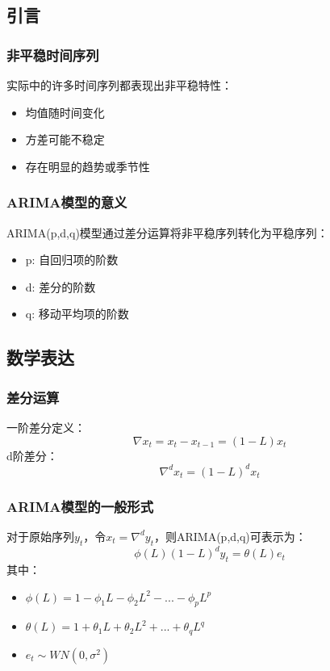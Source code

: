 \subsection{引言}
\subsubsection{非平稳时间序列}
实际中的许多时间序列都表现出非平稳特性：
\begin{itemize}
    \item 均值随时间变化
    \item 方差可能不稳定
    \item 存在明显的趋势或季节性
\end{itemize}

\subsubsection{ARIMA模型的意义}
ARIMA(p,d,q)模型通过差分运算将非平稳序列转化为平稳序列：
\begin{itemize}
    \item p: 自回归项的阶数
    \item d: 差分的阶数
    \item q: 移动平均项的阶数
\end{itemize}

\subsection{数学表达}
\subsubsection{差分运算}
一阶差分定义：
\[\nabla x_t = x_t - x_{t-1} = (1-L)x_t\]
d阶差分：
\[\nabla^d x_t = (1-L)^d x_t\]

\subsubsection{ARIMA模型的一般形式}
对于原始序列\(y_t\)，令\(x_t = \nabla^d y_t\)，则ARIMA(p,d,q)可表示为：
\[\phi(L)(1-L)^d y_t = \theta(L)e_t\]
其中：
\begin{itemize}
    \item \(\phi(L) = 1 - \phi_1L - \phi_2L^2 - ... - \phi_pL^p\)
    \item \(\theta(L) = 1 + \theta_1L + \theta_2L^2 + ... + \theta_qL^q\)
    \item \(e_t \sim WN(0,\sigma^2)\)
\end{itemize}

